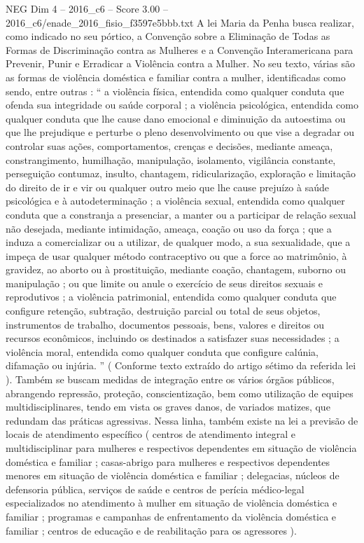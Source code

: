 \begin{textsample}{NEG Dim 4 – 2016\_c6 – Score 3.00 – 2016\_c6/enade\_2016\_fisio\_f3597e5bbb.txt}
A lei Maria da Penha busca realizar, como indicado no seu pórtico, a Convenção sobre a Eliminação de Todas as Formas de Discriminação contra as Mulheres e a Convenção Interamericana para Prevenir, Punir e Erradicar a Violência contra a Mulher.
No seu texto, várias são as formas de violência doméstica e familiar contra a mulher, identificadas como sendo, entre outras : “ a violência física, entendida como qualquer conduta que ofenda sua integridade ou saúde corporal ; a violência psicológica, entendida como qualquer conduta que lhe cause dano emocional e diminuição da autoestima ou que lhe prejudique e perturbe o pleno desenvolvimento ou que vise a degradar ou controlar suas ações, comportamentos, crenças e decisões, mediante ameaça, constrangimento, humilhação, manipulação, isolamento, vigilância constante, perseguição contumaz, insulto, chantagem, ridicularização, exploração e limitação do direito de ir e vir ou qualquer outro meio que lhe cause prejuízo à saúde psicológica e à autodeterminação ; a violência sexual, entendida como qualquer conduta que a constranja a presenciar, a manter ou a participar de relação sexual não desejada, mediante intimidação, ameaça, coação ou uso da força ; que a induza a comercializar ou a utilizar, de qualquer modo, a sua sexualidade, que a impeça de usar qualquer método contraceptivo ou que a force ao matrimônio, à gravidez, ao aborto ou à prostituição, mediante coação, chantagem, suborno ou manipulação ; ou que limite ou anule o exercício de seus direitos sexuais e reprodutivos ; a violência patrimonial, entendida como qualquer conduta que configure retenção, subtração, destruição parcial ou total de seus objetos, instrumentos de trabalho, documentos pessoais, bens, valores e direitos ou recursos econômicos, incluindo os destinados a satisfazer suas necessidades ; a violência moral, entendida como qualquer conduta que configure calúnia, difamação ou injúria. ” ( Conforme texto extraído do artigo sétimo da referida lei ).
Também se buscam medidas de integração entre os vários órgãos públicos, abrangendo repressão, proteção, conscientização, bem como utilização de equipes multidisciplinares, tendo em vista os graves danos, de variados matizes, que redundam das práticas agressivas.
Nessa linha, também existe na lei a previsão de locais de atendimento específico ( centros de atendimento integral e multidisciplinar para mulheres e respectivos dependentes em situação de violência doméstica e familiar ; casas-abrigo para mulheres e respectivos dependentes menores em situação de violência doméstica e familiar ; delegacias, núcleos de defensoria pública, serviços de saúde e centros de perícia médico-legal especializados no atendimento à mulher em situação de violência doméstica e familiar ; programas e campanhas de enfrentamento da violência doméstica e familiar ; centros de educação e de reabilitação para os agressores ).

\end{textsample}
